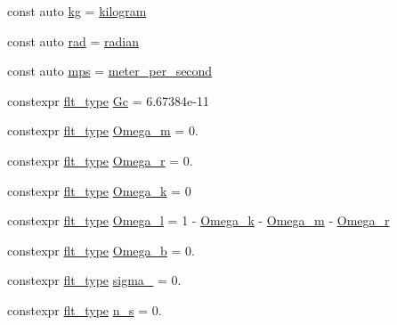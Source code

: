 \begin{DoxyCompactItemize}
const auto \hyperlink{namespaceIceBRG_a9233960f6792ea35145d7db55c13e85d}{kg} = \hyperlink{namespaceIceBRG_aaf220eb7f44e1dc31c74784c7e1ff646}{kilogram}
\item 
const auto \hyperlink{namespaceIceBRG_a556de4acca26a5661d50a5b75880e95f}{rad} = \hyperlink{namespaceIceBRG_af78fec3f42ee23d596793328b8991468}{radian}
\item 
const auto \hyperlink{namespaceIceBRG_ad5f22cbf0896ee33ad84e89b40c7c065}{mps} = \hyperlink{namespaceIceBRG_a08cdd3f6d83518620b066a3e6c65701d}{meter\+\_\+per\+\_\+second}
\item 
constexpr \hyperlink{lib_2IceBRG__main_2common_8h_ad0f130a56eeb944d9ef2692ee881ecc4}{flt\+\_\+type} \hyperlink{namespaceIceBRG_ae34ca33d4c7073fde8efcc53cf6fd5f4}{Gc} = 6.\+67384e-\/11
\item 
constexpr \hyperlink{lib_2IceBRG__main_2common_8h_ad0f130a56eeb944d9ef2692ee881ecc4}{flt\+\_\+type} \hyperlink{namespaceIceBRG_acddabe6e9443c1f8cb4b3c1093342aa3}{Omega\+\_\+m} = 0.
\item 
constexpr \hyperlink{lib_2IceBRG__main_2common_8h_ad0f130a56eeb944d9ef2692ee881ecc4}{flt\+\_\+type} \hyperlink{namespaceIceBRG_a8861a491b3586ab09c51c1bfc9020698}{Omega\+\_\+r} = 0.
\item 
constexpr \hyperlink{lib_2IceBRG__main_2common_8h_ad0f130a56eeb944d9ef2692ee881ecc4}{flt\+\_\+type} \hyperlink{namespaceIceBRG_afb35c6ac056f6db5d60d8cb03a7b997a}{Omega\+\_\+k} = 0
\item 
constexpr \hyperlink{lib_2IceBRG__main_2common_8h_ad0f130a56eeb944d9ef2692ee881ecc4}{flt\+\_\+type} \hyperlink{namespaceIceBRG_adb990b0d239fa166345fc328d173dfec}{Omega\+\_\+l} = 1 -\/ \hyperlink{namespaceIceBRG_afb35c6ac056f6db5d60d8cb03a7b997a}{Omega\+\_\+k} -\/ \hyperlink{namespaceIceBRG_acddabe6e9443c1f8cb4b3c1093342aa3}{Omega\+\_\+m} -\/ \hyperlink{namespaceIceBRG_a8861a491b3586ab09c51c1bfc9020698}{Omega\+\_\+r}
\item 
constexpr \hyperlink{lib_2IceBRG__main_2common_8h_ad0f130a56eeb944d9ef2692ee881ecc4}{flt\+\_\+type} \hyperlink{namespaceIceBRG_a109232f7a7118dd2b89b92a18df26a79}{Omega\+\_\+b} = 0.
\item 
constexpr \hyperlink{lib_2IceBRG__main_2common_8h_ad0f130a56eeb944d9ef2692ee881ecc4}{flt\+\_\+type} \hyperlink{namespaceIceBRG_a110c5768e115f02bf29631b9f0bde3cc}{sigma\+\_} = 0.
\item 
constexpr \hyperlink{lib_2IceBRG__main_2common_8h_ad0f130a56eeb944d9ef2692ee881ecc4}{flt\+\_\+type} \hyperlink{namespaceIceBRG_a08eb14835ddd7739204fc116ccfff92d}{n\+\_\+s} = 0.

\end{DoxyCompactItemize}

